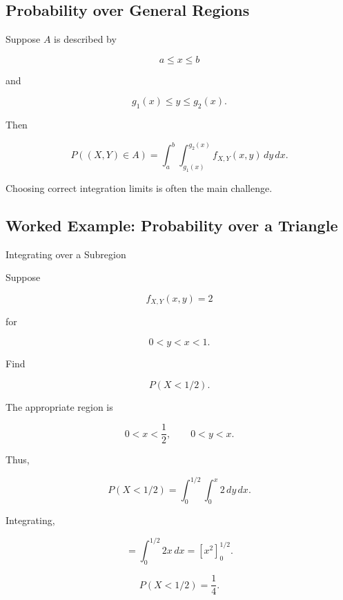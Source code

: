 \subsection{Probability over General Regions}
\label{subsec:probability-general-regions}

Suppose \(A\) is described by

\[
a\leq x\leq b
\]

and

\[
g_1(x)\leq y\leq g_2(x).
\]

Then

\[
\boxed{
P((X,Y)\in A)
=
\int_a^b
\int_{g_1(x)}^{g_2(x)}
f_{X,Y}(x,y)\,dy\,dx.
}
\]

Choosing correct integration limits is often the main challenge.

\subsection{Worked Example: Probability over a Triangle}
\label{subsec:worked-triangular-region-probability}

\begin{workedexamplebox}{Integrating over a Subregion}

Suppose

\[
f_{X,Y}(x,y)=2
\]

for

\[
0<y<x<1.
\]

Find

\[
P(X<1/2).
\]

The appropriate region is

\[
0<x<\frac12,
\qquad
0<y<x.
\]

Thus,

\[
P(X<1/2)
=
\int_0^{1/2}
\int_0^x
2\,dy\,dx.
\]

Integrating,

\[
=
\int_0^{1/2}
2x\,dx
=
\left[
x^2
\right]_0^{1/2}.
\]

\begin{answerbox}
\[
\boxed{
P(X<1/2)
=
\frac14.
}
\]
\end{answerbox}

\end{workedexamplebox}


